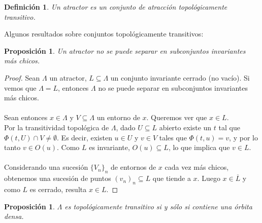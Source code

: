 \documentclass[12pt,a4paper]{article}
\newtheorem{proposition}[theorem]{Proposición}
\newtheorem{definition}[theorem]{Definición}
\begin{document}
\begin{definition}
    Un \textit{atractor} es un conjunto de atracción topológicamente transitivo.
\end{definition}
Algunos resultados sobre conjuntos topológicamente transitivos:
\begin{proposition}
    Un atractor no se puede separar en subconjuntos invariantes más chicos.
\end{proposition}
\begin{proof}
    Sean $\Lambda$ un atractor, $L \subseteq \Lambda$ un conjunto invariante cerrado (no vacío). Si vemos que $\Lambda = L$, entonces $\Lambda$ no se puede separar en subconjuntos invariantes más chicos.
    \\
    \\
    Sean entonces $x \in \Lambda$ y $V \subseteq \Lambda$ un entorno de $x$. Queremos ver que $x \in L$.
    \\
    Por la transitividad topológica de $\Lambda$, dado $U \subseteq L$ abierto existe un $t$ tal que $\Phi(t, U) \cap V \neq \emptyset$. Es decir, existen $u \in U$ y $v \in V$ tales que $\Phi(t,u) = v$, y por lo tanto $v \in O(u)$. Como $L$ es invariante, $O(u) \subseteq L$, lo que implica que $v \in L$.
    \\
    \\
    Considerando una sucesión $\{V_n\}_n$ de entornos de $x$ cada vez más chicos, obtenemos una sucesión de puntos $(v_n)_n \subseteq L$ que tiende a $x$. Luego $x \in \overline{L}$ y como $L$ es cerrado, resulta $x \in L$.
\end{proof}
\begin{proposition}
    $\Lambda$ es topológicamente transitivo si y sólo si contiene una órbita densa.
\end{proposition}
\end{document}
